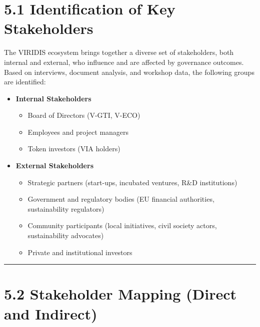 \documentclass[
  english,
  12pt,
  oneside,
  open=any]{scrbook}
\providecommand{\tightlist}{%
  \setlength{\itemsep}{0pt}\setlength{\parskip}{0pt}}\usepackage{longtable,booktabs,array}
\begin{document}
\section{5.1 Identification of Key Stakeholders}\label{sec-ident}

The VIRIDIS ecosystem brings together a diverse set of stakeholders,
both internal and external, who influence and are affected by governance
outcomes. Based on interviews, document analysis, and workshop data, the
following groups are identified:

\begin{itemize}
\tightlist
\item
  \textbf{Internal Stakeholders}

  \begin{itemize}
  \tightlist
  \item
    Board of Directors (V-GTI, V-ECO)\\
  \item
    Employees and project managers\\
  \item
    Token investors (VIA holders)
  \end{itemize}
\item
  \textbf{External Stakeholders}

  \begin{itemize}
  \tightlist
  \item
    Strategic partners (start-ups, incubated ventures, R\&D
    institutions)\\
  \item
    Government and regulatory bodies (EU financial authorities,
    sustainability regulators)\\
  \item
    Community participants (local initiatives, civil society actors,
    sustainability advocates)\\
  \item
    Private and institutional investors
  \end{itemize}
\end{itemize}

\begin{center}\rule{0.5\linewidth}{0.5pt}\end{center}

\section{5.2 Stakeholder Mapping (Direct and Indirect)}\label{sec-map}
\end{document}
